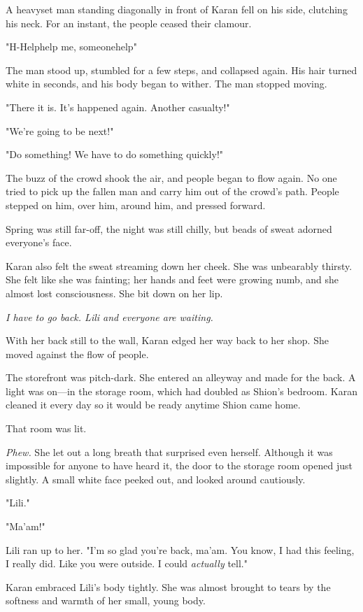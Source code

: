 A heavyset man standing diagonally in front of Karan fell on his side,
clutching his neck. For an instant, the people ceased their clamour.

"H-Help\el help me, someone\el help\el "

The man stood up, stumbled for a few steps, and collapsed again. His
hair turned white in seconds, and his body began to wither. The man
stopped moving.

"There it is. It's happened again. Another casualty!"

"We're going to be next!"

"Do something! We have to do something quickly!"

The buzz of the crowd shook the air, and people began to flow again. No
one tried to pick up the fallen man and carry him out of the crowd's
path. People stepped on him, over him, around him, and pressed forward.

Spring was still far-off, the night was still chilly, but beads of sweat
adorned everyone's face.

Karan also felt the sweat streaming down her cheek. She was unbearably
thirsty. She felt like she was fainting; her hands and feet were growing
numb, and she almost lost consciousness. She bit down on her lip.

\emph{I have to go back. Lili and everyone are waiting.}

With her back still to the wall, Karan edged her way back to her shop.
She moved against the flow of people.

The storefront was pitch-dark. She entered an alleyway and made for the
back. A light was on---in the storage room, which had doubled as Shion's
bedroom. Karan cleaned it every day so it would be ready anytime Shion
came home.

That room was lit.

\emph{Phew.} She let out a long breath that surprised even herself. Although it
was impossible for anyone to have heard it, the door to the storage room
opened just slightly. A small white face peeked out, and looked around
cautiously.

"Lili."

"Ma'am!"

Lili ran up to her. "I'm so glad you're back, ma'am. You know, I had
this feeling, I really did. Like you were outside. I could \emph{actually}
tell."

Karan embraced Lili's body tightly. She was almost brought to tears by
the softness and warmth of her small, young body.


